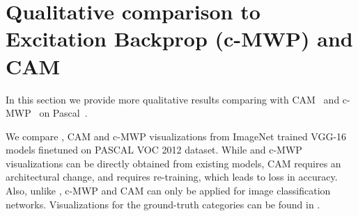 

\vspace{-10pt}
\section{Qualitative comparison to Excitation Backprop (c-MWP) and CAM}\label{sec:sup_comparison}
\vspace{-5pt}
In this section we provide more qualitative results comparing \gcam{} with CAM~\cite{zhou_cvpr16} and c-MWP~\cite{zhang2016top} on Pascal~\cite{pascal-voc-2007}. %




We compare \gcam{}, CAM and c-MWP visualizations from ImageNet trained VGG-16 models finetuned on PASCAL VOC 2012 dataset.
While \gcam{} and c-MWP visualizations can be directly obtained from existing models, CAM requires an architectural change, and requires re-training, which leads to loss in accuracy.
Also, unlike \gcam{}, c-MWP and CAM can only be applied for image classification networks.
Visualizations for the ground-truth categories can be found in . 






